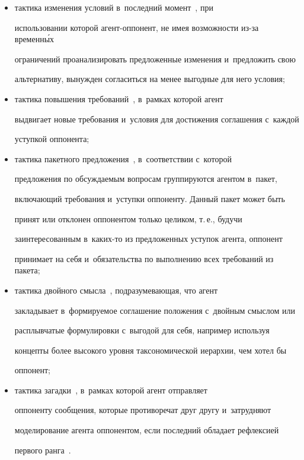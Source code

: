 \begin{itemize}
переговорах по нескольким вопросам. В~рамках данной тактики агент делает 


акцент на важности решения вопроса, который в~действительности для него 


второстепенен, и~в~обмен на уступку по нему требует от оппонента смены 


позиции по ключевому вопросу;


  \item тактика изменения условий в~последний момент~\cite{13-lis}, при 


использовании которой агент-оп\-по\-нент, не имея возможности из-за временн\'{ы}х 


ограничений проанализировать предложенные изменения и~предложить свою 


альтернативу, вынужден согласиться на менее выгодные для него условия;


  \item тактика повышения требований~\cite{13-lis}, в~рамках которой агент 


выдвигает новые требования и~условия для достижения соглашения с~каждой 


уступкой оппонента;


  \item тактика пакетного предложения~\cite{13-lis}, в~соответствии с~которой 


предложения по обсуждаемым вопросам группируются агентом в~пакет, 


включающий требования и~уступки оппоненту. Данный пакет может быть 


принят или отклонен оппонентом только целиком, т.\,е., будучи 


заинтересованным в~ка\-ких-то из предложенных уступок агента, оппонент 


принимает на себя и~обязательства по выполнению всех требований из пакета;


  \item тактика двойного смысла~\cite{13-lis}, подразумевающая, что агент 


закладывает в~формируемое соглашение положения с~двойным смыслом или 


расплывчатые формулировки с~выгодой для себя, например используя 


концепты более высокого уровня таксономической иерархии, чем хотел бы 


оппонент;


  \item  тактика загадки~\cite{13-lis}, в~рамках которой агент отправляет 


оппоненту сообщения, которые противоречат друг другу и~затрудняют 


моделирование агента оппонентом, если последний обладает рефлексией 


первого ранга~\cite{4-lis}.


  \end{itemize}


